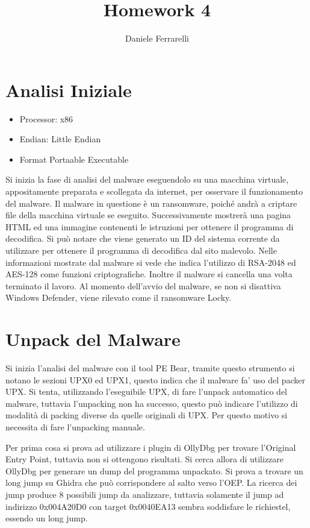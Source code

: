 \documentclass[a4paper,12pt]{article}
\title{Homework 4}
\author{Daniele Ferrarelli}
\date{}
\begin{document}
\maketitle
\tableofcontents

\section{Analisi Iniziale}
\begin{itemize}
	\item Processor: x86
	\item Endian: Little Endian
	\item Format Portaable Executable
\end{itemize}

Si inizia la fase di analisi del malware eseguendolo su una macchina virtuale, appositamente preparata e scollegata  da internet, per osservare il funzionamento del malware. Il malware in questione è un ransomware, poiché andrà a criptare file della macchina virtuale se eseguito. Successivamente mostrerà una pagina HTML ed una immagine contenenti le istruzioni per ottenere il programma di decodifica. Si può notare che viene generato un ID del sistema corrente da utilizzare per ottenere il programma di decodifica dal sito malevolo. Nelle informazioni mostrate dal malware si vede che indica l'utilizzo di RSA-2048 ed AES-128 come funzioni criptografiche.  Inoltre il malware si cancella una volta terminato il lavoro. Al momento dell'avvio del malware, se non si disattiva Windows Defender, viene rilevato come il ransomware Locky. 

\section{Unpack del Malware}
Si inizia l'analisi del malware con il tool PE Bear, tramite questo strumento si notano le sezioni UPX0 ed UPX1, questo indica che il malware fa' uso del packer UPX. Si tenta, utilizzando l'eseguibile UPX, di fare l'unpack automatico del malware, tuttavia l'unpacking non ha successo, questo può indicare l'utilizzo di modalità di packing diverse da quelle originali di UPX. Per questo motivo si necessita di fare l'unpacking manuale.

Per prima cosa si prova ad utilizzare i plugin di OllyDbg per trovare l'Original Entry Point, tuttavia non si ottengono risultati.
Si cerca allora di utilizzare OllyDbg per generare un dump del programma unpackato. Si prova a trovare un long jump su Ghidra che può corrispondere al salto verso l'OEP. La ricerca dei jump produce 8 possibili jump da analizzare, tuttavia solamente il jump ad indirizzo 0x004A20D0 con target 0x0040EA13 sembra soddisfare le richiestel, essendo un long jump. 
\end{document}
